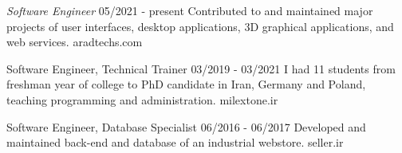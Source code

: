 \documentclass[a4paper,12pt]{memoir} %
\begin{document}

\Sep %








{\textit{Software Engineer}}
{05/2021 - present}
{Contributed to and maintained major projects of user interfaces, desktop applications, 3D graphical applications, and web services.}
{aradtechs.com}


{Software Engineer, Technical Trainer}
{03/2019 - 03/2021}
{I had 11 students from freshman year of college to PhD candidate in Iran, Germany and Poland, teaching programming and administration.}
{milextone.ir}


{Software Engineer, Database Specialist}
{06/2016 - 06/2017}
{Developed and maintained back-end and database of an industrial webstore.}
{seller.ir}


\Sep %


\end{document}

